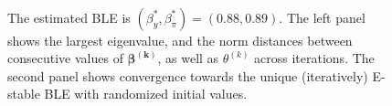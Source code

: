 




\begin{figure}
    \centering
 
             \mbox{
       }\\
 
      \caption{The estimated BLE is $(\beta_y^*,\beta_{\pi}^*)=(0.88, 0.89)$. The left panel shows the largest eigenvalue, and the norm distances between consecutive values of $\pmb{\beta^{(k)}}$, as well as $\theta^{(k)}$ across iterations. The second panel shows convergence towards the unique (iteratively) E-stable BLE with randomized initial values.}     
      \label{nkm_convergence}
\end{figure}
    


